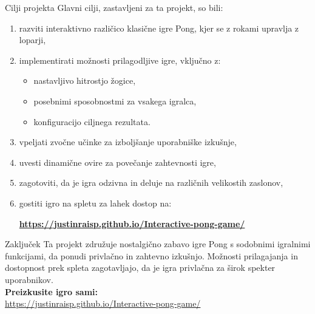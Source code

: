 \documentclass{beamer}
\begin{document}
\begin{frame}{Cilji projekta}
    Glavni cilji, zastavljeni za ta projekt, so bili:
    \begin{enumerate}
        \item razviti interaktivno različico klasične igre Pong, kjer se z rokami upravlja z loparji,
        \item implementirati možnosti prilagodljive igre, vključno z:
            \begin{itemize}
                \item nastavljivo hitrostjo žogice,
                \item posebnimi sposobnostmi za vsakega igralca,
                \item konfiguracijo ciljnega rezultata.
            \end{itemize}
        \item vpeljati zvočne učinke za izboljšanje uporabniške izkušnje,
        \item uvesti dinamične ovire za povečanje zahtevnosti igre,
        \item zagotoviti, da je igra odzivna in deluje na različnih velikostih zaslonov,
        \item gostiti igro na spletu za lahek dostop na:
        \begin{center}
            \textbf{\url{https://justinraisp.github.io/Interactive-pong-game/}}
        \end{center}
    \end{enumerate}
\end{frame}

\begin{frame}{Zaključek}
    Ta projekt združuje nostalgično zabavo igre Pong s sodobnimi igralnimi funkcijami, da ponudi privlačno in zahtevno izkušnjo. Možnosti prilagajanja in dostopnost prek spleta zagotavljajo, da je igra privlačna za širok spekter uporabnikov. \\
    
    \bigskip
    \textbf{Preizkusite igro sami:} \\
    \url{https://justinraisp.github.io/Interactive-pong-game/}
\end{frame}
\end{document}
